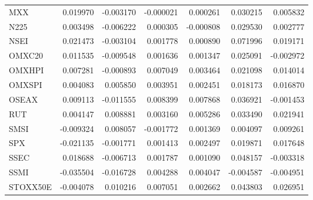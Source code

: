 \begin{longtable}{@{}lrrrrrr@{}}
MXX & 0.019970 & -0.003170 & -0.000021 & 0.000261 & 0.030215 & 0.005832 \\
N225 & 0.003498 & -0.006222 & 0.000305 & -0.000808 & 0.029530 & 0.002777 \\
NSEI & 0.021473 & -0.003104 & 0.001778 & 0.000890 & 0.071996 & 0.019171 \\
OMXC20 & 0.011535 & -0.009548 & 0.001636 & 0.001347 & 0.025091 & -0.002972 \\
OMXHPI & 0.007281 & -0.000893 & 0.007049 & 0.003464 & 0.021098 & 0.014014 \\
OMXSPI & 0.004083 & 0.005850 & 0.003951 & 0.002451 & 0.018173 & 0.016870 \\
OSEAX & 0.009113 & -0.011555 & 0.008399 & 0.007868 & 0.036921 & -0.001453 \\
RUT & 0.004147 & 0.008881 & 0.003160 & 0.005286 & 0.033490 & 0.021941 \\
SMSI & -0.009324 & 0.008057 & -0.001772 & 0.001369 & 0.004097 & 0.009261 \\
SPX & -0.021135 & -0.001771 & 0.001413 & 0.002497 & 0.019871 & 0.017648 \\
SSEC & 0.018688 & -0.006713 & 0.001787 & 0.001090 & 0.048157 & -0.003318 \\
SSMI & -0.035504 & -0.016728 & 0.004288 & 0.004047 & -0.004587 & -0.004951 \\
STOXX50E & -0.004078 & 0.010216 & 0.007051 & 0.002662 & 0.043803 & 0.026951 \\
\bottomrule
\end{longtable}\endgroup
